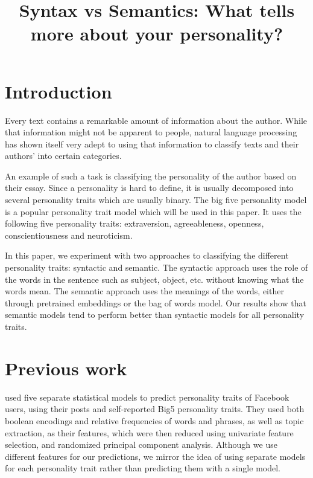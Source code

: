 \documentclass[10pt, a4paper]{article}
\title{Syntax vs Semantics: What tells more about your personality?}
\begin{document}
\maketitleabstract

\section{Introduction}

Every text contains a remarkable amount of information about the author.
While that information might not be apparent to people, natural language processing has shown itself very adept to using that information to classify texts and their authors' into certain categories.

An example of such a task is classifying the personality of the author based on their essay.
Since a personality is hard to define, it is usually decomposed into several personality traits which are usually binary.
The big five personality model is a popular personality trait model which will be used in this paper.
It uses the following five personality traits: extraversion, agreeableness, openness, conscientiousness and neuroticism.

In this paper, we experiment with two approaches to classifying the different personality traits: syntactic and semantic.
The syntactic approach uses the role of the words in the sentence such as subject, object, etc. without knowing what the words mean.
The semantic approach uses the meanings of the words, either through pretrained embeddings or the bag of words model.
Our results show that semantic models tend to perform better than syntactic models for all personality traits.

\section{Previous work}

\cite{park} used five separate statistical models to predict personality traits of Facebook users, using their posts and self-reported Big5 personality traits.
They used both boolean encodings and relative frequencies of words and phrases, as well as topic extraction, as their features, which were then reduced using univariate feature selection, and randomized principal component analysis.
Although we use different features for our predictions, we mirror the idea of using separate models for each personality trait rather than predicting them with a single model.
\end{document}
